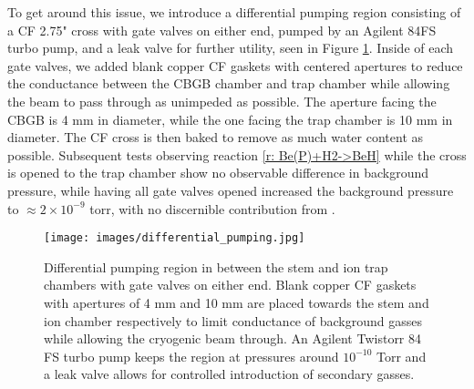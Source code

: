 To get around this issue, we introduce a differential pumping region consisting of a CF 2.75" cross with gate valves on either end, pumped by an Agilent 84FS turbo pump, and a leak valve for further utility, seen in Figure \ref{fig: differential pumping}. Inside of each gate valves, we added blank copper CF gaskets with centered apertures to reduce the conductance between the CBGB chamber and trap chamber while allowing the beam to pass through as unimpeded as possible. The aperture facing the CBGB is 4 mm in diameter, while the one facing the trap chamber is 10 mm in diameter. The CF cross is then baked to remove as much water content as possible. Subsequent tests observing reaction \ref{r: Be(P)+H2->BeH} while the cross is opened to the trap chamber show no observable difference in background pressure, while having all gate valves opened increased the background pressure to $\approx 2 \times 10^{-9}$ torr, with no discernible contribution from .

\begin{figure}
	\centering
	\texttt{[image: images/differential\_pumping.jpg]}
	\caption{Differential pumping region in between the stem and ion trap chambers with gate valves on either end. Blank copper CF gaskets with apertures of 4 mm and 10 mm are placed towards the stem and ion chamber respectively to limit conductance of background gasses while allowing the cryogenic beam through. An Agilent Twistorr 84 FS turbo pump keeps the region at pressures around $10^{-10}$ Torr and a leak valve allows for controlled introduction of secondary gasses.}
	\label{fig: differential pumping}
\end{figure}